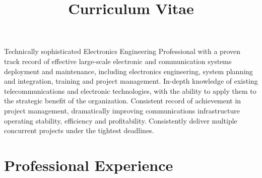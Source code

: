 \documentclass[10pt,letterpaper,sans]{moderncv} %
\title{Curriculum Vitae}
\begin{document}
\makecvtitle %






Technically sophisticated Electronics Engineering Professional with a proven track record of effective large-scale electronic and communication systems deployment and maintenance, including electronics engineering, system planning and integration, training and project management. In-depth knowledge of existing telecommunications and electronic technologies, with the ability to apply them to the strategic benefit of the organization. Consistent record of achievement in project management, dramatically improving communications infrastructure operating stability, efficiency and profitability. Consistently deliver multiple concurrent projects under the tightest deadlines.
\section{Professional Experience}

\end{document}
